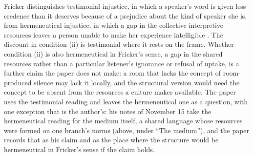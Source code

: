 Fricker distinguishes testimonial injustice, in which a speaker's word is given less credence than it deserves because of a prejudice about the kind of speaker she is, from hermeneutical injustice, in which a gap in the collective interpretive resources leaves a person unable to make her experience intelligible \cite{Fricker2007}. The discount in condition (ii) is testimonial where it rests on the frame. Whether condition (ii) is also hermeneutical in Fricker's sense, a gap in the shared resources rather than a particular listener's ignorance or refusal of uptake, is a further claim the paper does not make: a room that lacks the concept of room-produced silence may lack it locally, and the structural version would need the concept to be absent from the resources a culture makes available. The paper uses the testimonial reading and leaves the hermeneutical one as a question, with one exception that is the author's: his notes of November 15 take the hermeneutical reading for the medium itself, a shared language whose resources were formed on one branch's norms (above, under ``The medium''), and the paper records that as his claim and as the place where the structure would be hermeneutical in Fricker's sense if the claim holds.

